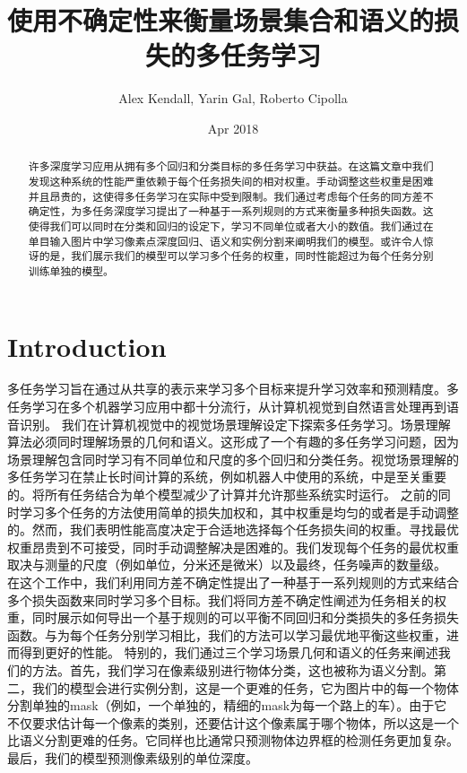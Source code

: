 \documentclass{ctexart}
\title{使用不确定性来衡量场景集合和语义的损失的多任务学习}
\date{Apr 2018}
\author{Alex Kendall, Yarin Gal, Roberto Cipolla}
\begin{document}
\maketitle
\begin{abstract}
    许多深度学习应用从拥有多个回归和分类目标的多任务学习中获益。在这篇文章中我们发现这种系统的性能严重依赖于每个任务损失间的相对权重。手动调整这些权重是困难并且昂贵的，这使得多任务学习在实际中受到限制。我们通过考虑每个任务的同方差不确定性，为多任务深度学习提出了一种基于一系列规则的方式来衡量多种损失函数。这使得我们可以同时在分类和回归的设定下，学习不同单位或者大小的数值。我们通过在单目输入图片中学习像素点深度回归、语义和实例分割来阐明我们的模型。或许令人惊讶的是，我们展示我们的模型可以学习多个任务的权重，同时性能超过为每个任务分别训练单独的模型。
\end{abstract}
\section{Introduction}
多任务学习旨在通过从共享的表示来学习多个目标来提升学习效率和预测精度。多任务学习在多个机器学习应用中都十分流行，从计算机视觉到自然语言处理再到语音识别。\newline
我们在计算机视觉中的视觉场景理解设定下探索多任务学习。场景理解算法必须同时理解场景的几何和语义。这形成了一个有趣的多任务学习问题，因为场景理解包含同时学习有不同单位和尺度的多个回归和分类任务。视觉场景理解的多任务学习在禁止长时间计算的系统，例如机器人中使用的系统，中是至关重要的。将所有任务结合为单个模型减少了计算并允许那些系统实时运行。\newline
之前的同时学习多个任务的方法使用简单的损失加权和，其中权重是均匀的或者是手动调整的。然而，我们表明性能高度决定于合适地选择每个任务损失间的权重。寻找最优权重昂贵到不可接受，同时手动调整解决是困难的。我们发现每个任务的最优权重取决与测量的尺度（例如单位，分米还是微米）以及最终，任务噪声的数量级。\newline
在这个工作中，我们利用同方差不确定性提出了一种基于一系列规则的方式来结合多个损失函数来同时学习多个目标。我们将同方差不确定性阐述为任务相关的权重，同时展示如何导出一个基于规则的可以平衡不同回归和分类损失的多任务损失函数。与为每个任务分别学习相比，我们的方法可以学习最优地平衡这些权重，进而得到更好的性能。\newline
特别的，我们通过三个学习场景几何和语义的任务来阐述我们的方法。首先，我们学习在像素级别进行物体分类，这也被称为语义分割。第二，我们的模型会进行实例分割，这是一个更难的任务，它为图片中的每一个物体分割单独的mask（例如，一个单独的，精细的mask为每一个路上的车）。由于它不仅要求估计每一个像素的类别，还要估计这个像素属于哪个物体，所以这是一个比语义分割更难的任务。它同样也比通常只预测物体边界框的检测任务更加复杂。最后，我们的模型预测像素级别的单位深度。
\end{document}
